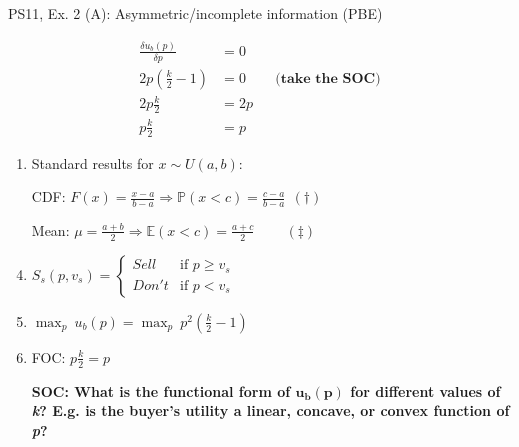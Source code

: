 \begin{frame}{PS11, Ex. 2 (A): Asymmetric/incomplete information (PBE)}
\begin{multicols}{2}
\begin{align*}
        \frac{\delta u_b(p)}{\delta p}&=0\\
        2p\left(\frac{k}{2}-1\right)&=0&&\textbf{(take the SOC)}\\
        2p\frac{k}{2}&=2p\\
        p\frac{k}{2}&=p
      \end{align*}
      \vfill\null\columnbreak
      \begin{enumerate}
        \item Standard results for $x\sim U(a, b):$
        \item[CDF:] $F(x)=\frac{x-a}{b-a}\Rightarrow\mathbb{P}(x<c)=\frac{c-a}{b-a}\ \ (\dagger)$
        \item[Mean:] $\mu=\frac{a+b}{2}\Rightarrow\mathbb{E}(x<c)=\frac{a+c}{2}\quad\quad\ (\ddagger)$
        \item $S_s(p,v_s)=\left\{\begin{array}{ll}
          Sell  & \text{if }p\geq v_s \\
          Don't & \text{if }p < v_s
        \end{array}\right.$
        \item $\displaystyle{\max_p}\ u_b(p)=\displaystyle{\max_p}\ p^2\left(\frac{k}{2}-1\right)$
        \item FOC: $p\frac{k}{2}=p$
        \item[] \textbf{SOC: What is the functional form of $\bm{u_b(p)}$ for different values of \textit{k}? E.g. is the buyer's utility a linear, concave, or convex function of \textit{p}?}
      \end{enumerate}
      \vfill\null
    \end{multicols}
\end{frame}
